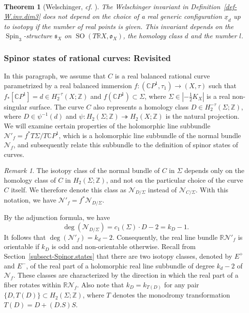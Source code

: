\documentclass[11pt]{amsart}
\numberwithin{equation}{section}
\theoremstyle{definition}
\theoremstyle{plain}
\newtheorem{theorem}[definition]{Theorem}
\theoremstyle{remark}
\newtheorem{remark}[definition]{Remark}
\newcommand{\R}{\mathbb{R}}
\newcommand{\Z}{\mathbb{Z}}
\newcommand{\C}{\mathbb{C}}
\DeclareMathOperator{\SO}{SO}
\DeclareMathOperator{\Spin}{Spin}
\begin{document}
   \begin{theorem}[Welschinger, \textit{cf.} \cite{welschinger2005spinor,welschinger2005stongly}]
The Welschinger invariant in Definition~\ref{def-W.inv.dim3} does not depend on the choice of a real generic  configuration $\underline{x}_d$  up to isotopy if the number of real points is given. This invariant depends on the $\Spin_3$-structure $\mathfrak{s}_X$ on $\SO(T\R X,\mathfrak{o}_X)$, 
the homology class $d$ and the number $l$.
\end{theorem}


\subsubsection{Spinor states of rational curves: Revisited} \label{subsect-Spinorstates.revisited}
In this paragraph, we assume that $C$ is a real balanced rational curve parametrized by a real balanced immersion $f\colon (\C P^1,\tau_1)\to (X,\tau)$ such that $f_*[\C P^1]=d\in  H_2^{-\tau}(X;\Z)$ and $f (\C P^1)\subset \Sigma$, where $\Sigma\in |-\frac{1}{2}K_X|$ is a real non-singular surface. The curve $C$ also represents a homology class $D\in H_2^{-\tau}(\Sigma;\Z)$, where $D\in \psi^{-1}(d)$ and $\psi\colon  H_2(\Sigma;\Z)\twoheadrightarrow H_2(X;\Z)$ is the natural projection.  
We will examine certain properties  of the holomorphic line subbundle $\mathcal{N}'_f=f^*T\Sigma/T\C P^1$, which is a holomorphic line subbundle of the normal bundle $\mathcal{N}_f$,   and subsequently relate this subbundle to the definition of spinor states of curves.

\begin{remark}
  The isotopy class of the normal bundle of $C$ in $\Sigma$ depends only on the homology class of $C$ in $H_2(\Sigma;\mathbb{Z})$, and not on the particular choice of the curve $C$ itself. We therefore denote this class as $\mathcal{N}_{D/\Sigma}$ instead of $\mathcal{N}_{C/\Sigma}$. With this notation, we have $\mathcal{N}'_f=f^*\mathcal{N}_{D/\Sigma}$.
\end{remark}

By the adjunction formula, we have
$$\deg(\mathcal{N}_{D/\Sigma})=c_1(\Sigma)\cdot D-2=k_D-1.$$ 
It follows that $\deg(\mathcal{N}'_f)=k_d-2$. Consequently, the real line bundle $\R \mathcal{N}'_f$  is orientable if  $k_D$ is odd and non-orientable otherwise. Recall from Section~\ref{subsect-Spinor.states} that there are two isotopy classes, denoted by  $E^+$ and $E^-$, of the real part of a holomorphic real line subbundle  of degree $k_d-2$ of $\mathcal{N}_{f}$. These classes are characterized by the direction in which the real part of a fiber rotates within $\R \mathcal{N}_{f}$. Also note  that $k_D=k_{T(D)}$ for any pair $\{D, T(D)\}\subset H_2(\Sigma;\Z)$, where $T$ denotes the monodromy transformation  $T(D)=D+(D.S)S$.
\end{document}

